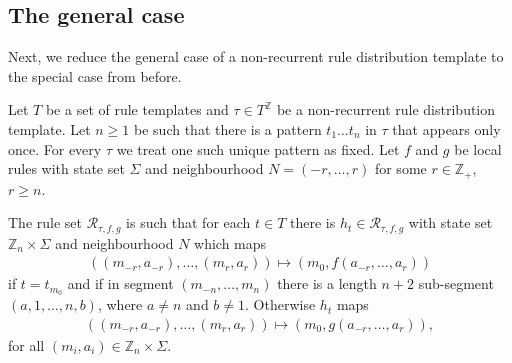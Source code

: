 \documentclass[runningheads]{llncs}
\newcommand{\Z}{\mathbb{Z}}
\begin{document}
\subsection{The general case}

Next, we reduce the general case of a non-recurrent rule distribution template to the special case from before. 


\begin{definition}
Let $T$ be a set of rule templates and $\tau \in T^\Z$ be a non-recurrent rule distribution template. Let $n\geq 1$ be such that there is a pattern $t_1 \ldots t_n$ in $\tau$ that appears only once. For every $\tau$ we treat one such unique pattern as fixed. Let $f$ and $g$ be local rules with state set $\Sigma$ and neighbourhood $N=(-r,\ldots,r)$ for some $r \in \Z_+$, $r\geq n$. 

The rule set $\mathcal{R}_{\tau,f,g}$ is such that for each $t\in T$ there is $h_t\in \mathcal{R}_{\tau,f,g}$ with state set $\Z_n \times \Sigma$ and neighbourhood $N$ which maps
\begin{align*}
((m_{-r}, a_{-r}),\ldots, (m_{r},a_{r})) \mapsto 
(m_0,f(a_{-r},\ldots, a_{r}))
\end{align*}
if $t=t_{m_0}$ and if in segment $(m_{-n},\ldots, m_n)$ there is a length $n+2$ sub-segment $(a,1,\ldots,n,b)$, where $a\neq n$ and $b\neq 1$. Otherwise $h_t$ maps
\begin{align*}
((m_{-r}, a_{-r}),\ldots, (m_{r},a_{r})) \mapsto 
(m_0,g(a_{-r},\ldots, a_{r})),
\end{align*}
for all $(m_i,a_i) \in \Z_n \times \Sigma$.
\end{definition}
\end{document}
